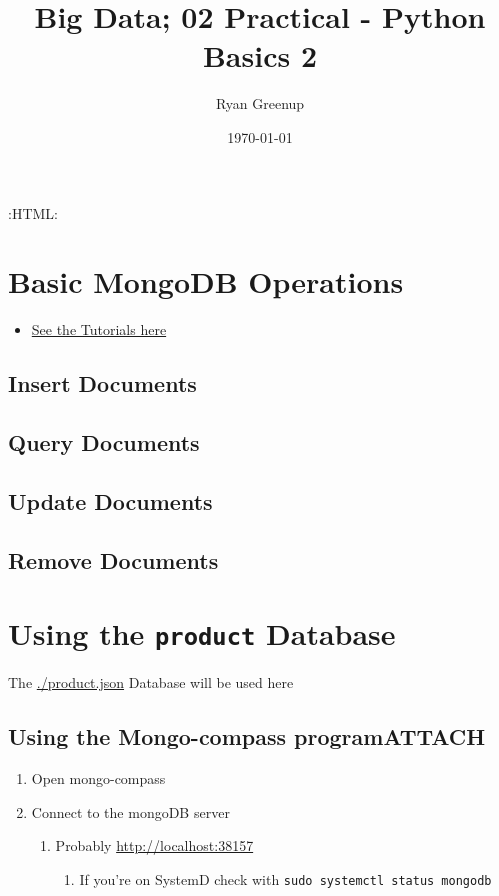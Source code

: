 \documentclass[11pt]{article}
\author{Ryan Greenup}
\date{\today}
\title{Big Data; 02 Practical - Python Basics 2}
\begin{document}
\maketitle
\tableofcontents

:HTML:

\section{Basic MongoDB Operations}
\label{sec:orgf97b54d}
\begin{itemize}
\item \href{https://docs.mongodb.com/manual/tutorial/insert-documents/}{See the Tutorials here}
\end{itemize}
\subsection{Insert Documents}
\label{sec:orgc89a261}

\subsection{Query Documents}
\label{sec:org533f114}
\subsection{Update Documents}
\label{sec:orgacd83d9}
\subsection{Remove Documents}
\label{sec:org834a7ff}

\section{Using the \texttt{product} Database}
\label{sec:orgf92bb53}
The \url{./product.json} Database will be used here
\subsection{Using the Mongo-compass program\hfill{}\textsc{ATTACH}}
\label{sec:orgde5a1f2}
\begin{enumerate}
\item Open mongo-compass
\item Connect to the mongoDB server
\begin{enumerate}
\item Probably \url{http://localhost:38157}
\begin{enumerate}
\item If you're on SystemD check with \texttt{sudo systemctl status mongodb}
\end{enumerate}
\end{enumerate}
\end{enumerate}
\end{document}
